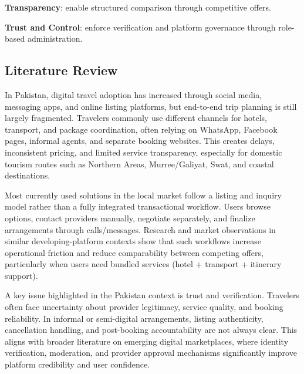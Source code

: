 \documentclass[12pt,a4paper]{article}
\newlength{\ThesisParagraphIndent}
\newcommand{\ThesisParagraph}[1]{%
  \par\begingroup
  \setlength{\leftskip}{\ThesisParagraphIndent}%
  \setlength{\parindent}{0pt}%
  \noindent#1\par
  \endgroup}
\begin{document}
\begin{list}{}{\setlength{\leftmargin}{\dimexpr\ThesisParagraphIndent+1.5em\relax}\setlength{\labelsep}{0.5em}\setlength{\topsep}{2pt}\setlength{\parsep}{0pt}}
\item[\textbullet] \textbf{Transparency}: enable structured comparison through competitive offers.
\end{list}


\begin{list}{}{\setlength{\leftmargin}{\dimexpr\ThesisParagraphIndent+1.5em\relax}\setlength{\labelsep}{0.5em}\setlength{\topsep}{2pt}\setlength{\parsep}{0pt}}
\item[\textbullet] \textbf{Trust and Control}: enforce verification and platform governance through role-based administration.
\end{list}


\subsection{Literature Review}

\ThesisParagraph{In Pakistan, digital travel adoption has increased through social media, messaging apps, and online listing platforms, but end-to-end trip planning is still largely fragmented. Travelers commonly use different channels for hotels, transport, and package coordination, often relying on WhatsApp, Facebook pages, informal agents, and separate booking websites. This creates delays, inconsistent pricing, and limited service transparency, especially for domestic tourism routes such as Northern Areas, Murree/Galiyat, Swat, and coastal destinations.}


\ThesisParagraph{Most currently used solutions in the local market follow a listing and inquiry model rather than a fully integrated transactional workflow. Users browse options, contact providers manually, negotiate separately, and finalize arrangements through calls/messages. Research and market observations in similar developing-platform contexts show that such workflows increase operational friction and reduce comparability between competing offers, particularly when users need bundled services (hotel + transport + itinerary support).}


\ThesisParagraph{A key issue highlighted in the Pakistan context is trust and verification. Travelers often face uncertainty about provider legitimacy, service quality, and booking reliability. In informal or semi-digital arrangements, listing authenticity, cancellation handling, and post-booking accountability are not always clear. This aligns with broader literature on emerging digital marketplaces, where identity verification, moderation, and provider approval mechanisms significantly improve platform credibility and user confidence.}
\end{document}

